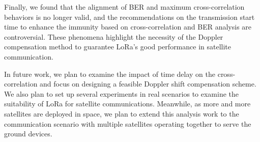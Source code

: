 \documentclass{IEEEtaes}
\theoremstyle{plain}
\begin{document}
Finally, we found that the alignment of BER and maximum cross-correlation behaviors is no longer valid, and the recommendations on the transmission start time to enhance the immunity based on cross-correlation and BER analysis are controversial. These phenomena highlight the necessity of the Doppler compensation method to guarantee LoRa's good performance in satellite communication.

In future work, we plan to examine the impact of time delay on the cross-correlation and focus on designing a feasible Doppler shift compensation scheme. We also plan to set up several experiments in real scenarios to examine the suitability of LoRa for satellite communications. Meanwhile, as more and more satellites are deployed in space, we plan to extend this analysis work to the communication scenario with multiple satellites operating together to serve the ground devices.





\end{document}
